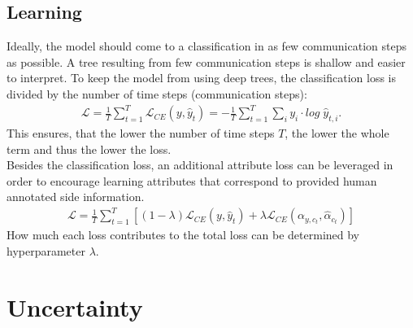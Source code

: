 \documentclass[a4paper,cleardoubleempty,BCOR1cm, 11pt]{report}
\begin{document}
\subsection{Learning}
Ideally, the model should come to a classification in as few communication steps as possible. A tree resulting from few communication steps is shallow and easier to interpret. To keep the model from using deep trees, the classification loss is divided by the number of time steps (communication steps):
\begin{align}
	\mathcal{L} = \frac{1}{T} \sum_{t=1}^{T}\mathcal{L}_{CE}(y, \hat{y}_t) = - \frac{1}{T}\sum_{t=1}^{T}\sum_{i}y_i \cdot log\;\hat{y}_{t,i}.
\end{align}
This ensures, that the lower the number of time steps $T$, the lower the whole term and thus the lower the loss.\\
Besides the classification loss, an additional attribute loss can be leveraged in order to encourage learning attributes that correspond to provided human annotated side information.
\begin{align}
	\mathcal{L} = \frac{1}{T}\sum_{t=1}^{T}\left[(1-\lambda)\mathcal{L}_{CE}(y,\hat{y}_t) + \lambda \mathcal{L}_{CE}(\alpha_{y,c_t},\hat{\alpha}_{c_t}) \right]
\end{align}
How much each loss contributes to the total loss can be determined by hyperparameter $\lambda$.



\section{Uncertainty}
\end{document}
